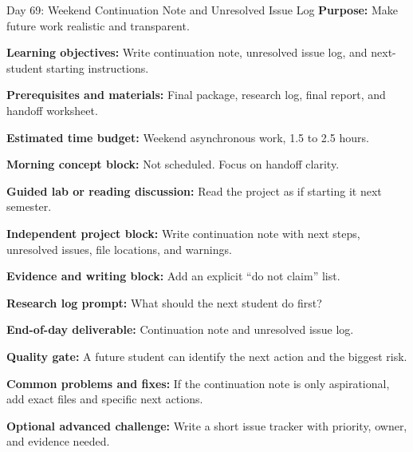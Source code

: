 \begin{dailybox}{Day 69: Weekend Continuation Note and Unresolved Issue Log}
\textbf{Purpose:} Make future work realistic and transparent.

\textbf{Learning objectives:} Write continuation note, unresolved issue log, and next-student starting instructions.

\textbf{Prerequisites and materials:} Final package, research log, final report, and handoff worksheet.

\textbf{Estimated time budget:} Weekend asynchronous work, 1.5 to 2.5 hours.

\textbf{Morning concept block:} Not scheduled. Focus on handoff clarity.

\textbf{Guided lab or reading discussion:} Read the project as if starting it next semester.

\textbf{Independent project block:} Write continuation note with next steps, unresolved issues, file locations, and warnings.

\textbf{Evidence and writing block:} Add an explicit ``do not claim'' list.

\textbf{Research log prompt:} What should the next student do first?

\textbf{End-of-day deliverable:} Continuation note and unresolved issue log.

\textbf{Quality gate:} A future student can identify the next action and the biggest risk.

\textbf{Common problems and fixes:} If the continuation note is only aspirational, add exact files and specific next actions.

\textbf{Optional advanced challenge:} Write a short issue tracker with priority, owner, and evidence needed.
\end{dailybox}

